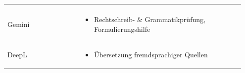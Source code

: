 \begin{table}[hbt]
\begin{tabular}{>{\raggedright\arraybackslash}p{0.3\linewidth} >{\raggedright\arraybackslash}p{0.65\linewidth}}
\begin{itemize}[noitemsep,topsep=0pt,partopsep=0pt,parsep=0pt]
		\end{itemize} \\
		Gemini &
		\vspace{-\topsep}
		\begin{itemize}[noitemsep,topsep=0pt,partopsep=0pt,parsep=0pt]
			\item Rechtschreib- \& Grammatikprüfung, Formulierungshilfe
		\end{itemize} \\
		DeepL &
		\vspace{-\topsep}
		\begin{itemize}[noitemsep,topsep=0pt,partopsep=0pt,parsep=0pt]
			\item Übersetzung fremdsprachiger Quellen
		\end{itemize} \\
		\hline
		
	\end{tabular} 
\end{table}

